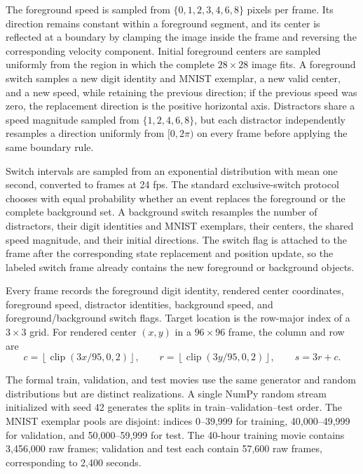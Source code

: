 The foreground speed is sampled from \(\{0,1,2,3,4,6,8\}\) pixels per frame. Its direction remains constant within a foreground segment, and its center is reflected at a boundary by clamping the image inside the frame and reversing the corresponding velocity component. Initial foreground centers are sampled uniformly from the region in which the complete \(28\times28\) image fits. A foreground switch samples a new digit identity and MNIST exemplar, a new valid center, and a new speed, while retaining the previous direction; if the previous speed was zero, the replacement direction is the positive horizontal axis. Distractors share a speed magnitude sampled from \(\{1,2,4,6,8\}\), but each distractor independently resamples a direction uniformly from \([0,2\pi)\) on every frame before applying the same boundary rule.

Switch intervals are sampled from an exponential distribution with mean one second, converted to frames at 24 fps. The standard exclusive-switch protocol chooses with equal probability whether an event replaces the foreground or the complete background set. A background switch resamples the number of distractors, their digit identities and MNIST exemplars, their centers, the shared speed magnitude, and their initial directions. The switch flag is attached to the frame after the corresponding state replacement and position update, so the labeled switch frame already contains the new foreground or background objects.

Every frame records the foreground digit identity, rendered center coordinates, foreground speed, distractor identities, background speed, and foreground/background switch flags. Target location is the row-major index of a \(3\times3\) grid. For rendered center \((x,y)\) in a \(96\times96\) frame, the column and row are
\[
c=\left\lfloor\operatorname{clip}\!\left(3x/95,0,2\right)\right\rfloor,
\qquad
r=\left\lfloor\operatorname{clip}\!\left(3y/95,0,2\right)\right\rfloor,
\qquad
s=3r+c.
\]

The formal train, validation, and test movies use the same generator and random distributions but are distinct realizations. A single NumPy random stream initialized with seed 42 generates the splits in train--validation--test order. The MNIST exemplar pools are disjoint: indices 0--39,999 for training, 40,000--49,999 for validation, and 50,000--59,999 for test. The 40-hour training movie contains 3,456,000 raw frames; validation and test each contain 57,600 raw frames, corresponding to 2,400 seconds.

